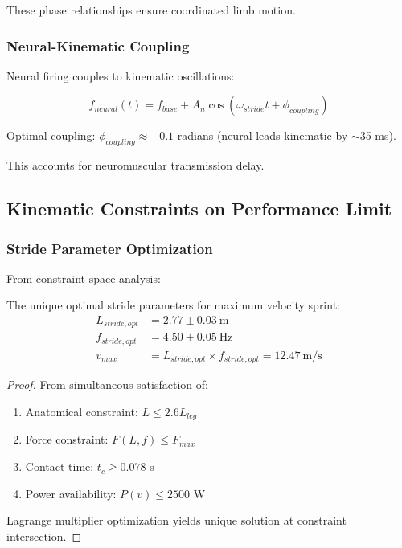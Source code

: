 These phase relationships ensure coordinated limb motion.

\subsubsection{Neural-Kinematic Coupling}

Neural firing couples to kinematic oscillations:

\begin{equation}
f_{neural}(t) = f_{base} + A_n \cos(\omega_{stride} t + \phi_{coupling})
\label{eq:neural_kinematic_coupling}
\end{equation}

Optimal coupling: $\phi_{coupling} \approx -0.1$ radians (neural leads kinematic by $\sim$35 ms).

This accounts for neuromuscular transmission delay.

\subsection{Kinematic Constraints on Performance Limit}

\subsubsection{Stride Parameter Optimization}

From constraint space analysis:

\begin{theorem}
The unique optimal stride parameters for maximum velocity sprint:
\begin{align}
L_{stride,opt} &= 2.77 \pm 0.03~\text{m} \\
f_{stride,opt} &= 4.50 \pm 0.05~\text{Hz} \\
v_{max} &= L_{stride,opt} \times f_{stride,opt} = 12.47~\text{m/s}
\end{align}
\end{theorem}

\begin{proof}
From simultaneous satisfaction of:
\begin{enumerate}
\item Anatomical constraint: $L \leq 2.6 L_{leg}$
\item Force constraint: $F(L,f) \leq F_{max}$
\item Contact time: $t_c \geq 0.078$ s
\item Power availability: $P(v) \leq 2500$ W
\end{enumerate}

Lagrange multiplier optimization yields unique solution at constraint intersection.
\end{proof}

